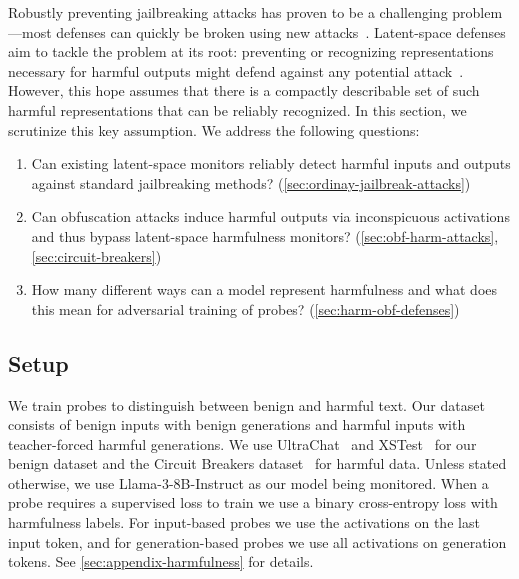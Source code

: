 \documentclass{article}
\begin{document}
Robustly preventing jailbreaking attacks has proven to be a
challenging problem---most defenses can quickly be broken using
new attacks~\citep{shayegani2023survey, 
jin2024jailbreakzoo, yi2024jailbreak, li2024llm}.
Latent-space defenses aim to tackle the problem at
its root: preventing or recognizing representations necessary for harmful
outputs might defend against any potential attack~\citep{zou2024improving}. 
However, this hope assumes that there is a compactly describable 
set of such harmful representations that can be reliably recognized.
In this section, we scrutinize this key assumption. 
We address the following questions: 
\begin{enumerate}[(1)]
    \item Can existing latent-space monitors reliably detect harmful inputs and outputs against standard jailbreaking methods? (\cref{sec:ordinay-jailbreak-attacks})\label{item:jailbreaks-question}
    \item Can obfuscation attacks induce harmful outputs via inconspicuous activations and thus bypass latent-space harmfulness monitors? (\cref{sec:obf-harm-attacks}, \cref{sec:circuit-breakers})\label{item:obf-harm-question}
    \item How many different ways can a model 
    represent harmfulness and what does this mean for adversarial training of probes?
    (\cref{sec:harm-obf-defenses})\label{item:adv-question}
\end{enumerate}

\subsection{Setup}
\label{sec:harmfulness-setup}

We train probes to distinguish between benign and harmful text. 
Our dataset consists of benign inputs with benign generations and harmful inputs with teacher-forced harmful generations. 
We use UltraChat~\citep{ding2023enhancing} and
XSTest~\citep{rottger2023xstest} for our benign dataset 
and the Circuit Breakers 
dataset~\citep{zou2024improving} for harmful data.
Unless stated otherwise, we use Llama-3-8B-Instruct as 
our model being monitored. 
When a probe requires a supervised loss to train we use 
a binary cross-entropy loss with harmfulness labels. For input-based probes we use
the activations on the last input token, and for generation-based
probes we use all activations on generation tokens.
See \cref{sec:appendix-harmfulness} for details.
\end{document}
